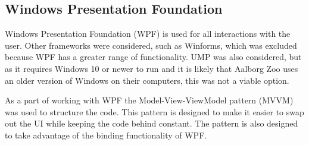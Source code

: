 \subsection{Windows Presentation Foundation} \label{ssc:tech_wpf}
Windows Presentation Foundation (WPF) is used for all interactions with the user. Other frameworks were considered, such as Winforms, which was excluded because WPF has a greater range of functionality. UMP was also considered, but as it requires Windows 10 or newer to run and it is likely that Aalborg Zoo uses an older version of Windows on their computers, this was not a viable option.
\par
As a part of working with WPF the Model-View-ViewModel pattern (MVVM) was used to structure the code. This pattern is designed to make it easier to swap out the UI while keeping the code behind constant. The pattern is also designed to take advantage of the binding functionality of WPF. 